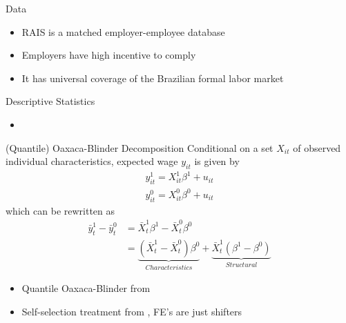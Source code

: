 \documentclass[xcolor={dvipsnames},8pt]{beamer}
\theoremstyle{definition}
\begin{document}
\begin{frame}{Data}
 
\begin{itemize}
    \item RAIS is a matched employer-employee database
    \item Employers have high incentive to comply
    \item It has universal coverage of the Brazilian formal labor market
\end{itemize}

\end{frame}

\begin{frame}{Descriptive Statistics}

\begin{itemize}
    \item 
\end{itemize}
\end{frame}

\begin{frame}{(Quantile) Oaxaca-Blinder Decomposition}
Conditional on a set $X_{it}$ of observed individual characteristics, expected wage $y_{it}$ is given by
\begin{align*}
    y_{it}^{1} = X_{it}^{1}\beta^{1}+u_{it}\\
    y_{it}^{0} = X_{it}^{0}\beta^{0}+u_{it}
\end{align*}
which can be rewritten as
\begin{align*}
    \bar{y}_{t}^{1} - \bar{y}_{t}^{0} &= \bar{X}_{t}^{1}\beta^{1} -\bar{X}_{t}^{0}\beta^{0} \\
    &= \underbrace{\left(\bar{X}_{t}^{1}-\bar{X}_{t}^{0}\right)\beta^{0}}_{Characteristics} +\underbrace{\bar{X}_{t}^{1}\left(\beta^{1}-\beta^{0}\right)}_{Structural}
\end{align*}
\begin{itemize}
    \item Quantile Oaxaca-Blinder from \citep{Chernozhukov2013} 
    \item Self-selection treatment from \citep{Canay2011}, FE's are just shifters
\end{itemize}
\end{frame}
\end{document}
